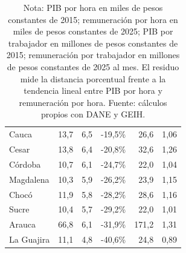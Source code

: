 \begin{table}[H]
\begin{tabular}{lrrrrr}
Cauca & 13,7 & 6,5 & -19,5\% & 26,6 & 1,06 \\
Cesar & 13,8 & 6,4 & -20,8\% & 32,6 & 1,26 \\
Córdoba & 10,7 & 6,1 & -24,7\% & 22,0 & 1,04 \\
Magdalena & 10,3 & 5,9 & -26,2\% & 23,9 & 1,15 \\
Chocó & 11,9 & 5,8 & -28,2\% & 28,6 & 1,16 \\
Sucre & 10,4 & 5,7 & -29,2\% & 22,0 & 1,01 \\
Arauca & 66,8 & 6,1 & -31,9\% & 171,2 & 1,31 \\
La Guajira & 11,1 & 4,8 & -40,6\% & 24,8 & 0,89 \\
\bottomrule
\end{tabular}
\caption*{\footnotesize Nota: PIB por hora en miles de pesos constantes de 2015; remuneración por hora en miles de pesos constantes de 2025; PIB por trabajador en millones de pesos constantes de 2015; remuneración por trabajador en millones de pesos constantes de 2025 al mes. El residuo mide la distancia porcentual frente a la tendencia lineal entre PIB por hora y remuneración por hora. Fuente: cálculos propios con DANE y GEIH.}
\end{table}